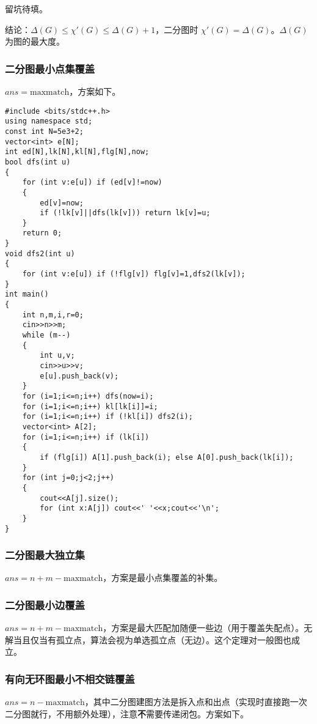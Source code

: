 \documentclass[12pt]{ctexart}
\begin{document}
留坑待填。

结论：$\Delta(G)\le \chi'(G) \le \Delta(G)+1$，二分图时 $\chi'(G)=\Delta(G)$。$\Delta(G)$ 为图的最大度。

\subsubsection{二分图最小点集覆盖}

$ans=\text{maxmatch}$，方案如下。

\begin{lstlisting}
#include <bits/stdc++.h>
using namespace std;
const int N=5e3+2;
vector<int> e[N];
int ed[N],lk[N],kl[N],flg[N],now;
bool dfs(int u)
{
	for (int v:e[u]) if (ed[v]!=now)
	{
		ed[v]=now;
		if (!lk[v]||dfs(lk[v])) return lk[v]=u;
	}
	return 0;
}
void dfs2(int u)
{
	for (int v:e[u]) if (!flg[v]) flg[v]=1,dfs2(lk[v]);
}
int main()
{
	int n,m,i,r=0;
	cin>>n>>m;
	while (m--)
	{
		int u,v;
		cin>>u>>v;
		e[u].push_back(v);
	}
	for (i=1;i<=n;i++) dfs(now=i);
	for (i=1;i<=n;i++) kl[lk[i]]=i;
	for (i=1;i<=n;i++) if (!kl[i]) dfs2(i);
	vector<int> A[2];
	for (i=1;i<=n;i++) if (lk[i])
	{
		if (flg[i]) A[1].push_back(i); else A[0].push_back(lk[i]);
	}
	for (int j=0;j<2;j++)
	{
		cout<<A[j].size();
		for (int x:A[j]) cout<<' '<<x;cout<<'\n';
	}
}
\end{lstlisting}

\subsubsection{二分图最大独立集}

$ans=n+m-\text{maxmatch}$，方案是最小点集覆盖的补集。

\subsubsection{二分图最小边覆盖}

$ans=n+m-\text{maxmatch}$，方案是最大匹配加随便一些边（用于覆盖失配点）。无解当且仅当有孤立点，算法会视为单选孤立点（无边）。这个定理对一般图也成立。

\subsubsection{有向无环图最小不相交链覆盖}

$ans=n-\text{maxmatch}$，其中二分图建图方法是拆入点和出点（实现时直接跑一次二分图就行，不用额外处理），注意\textbf{不}需要传递闭包。方案如下。
\end{document}
